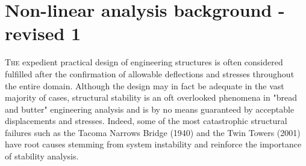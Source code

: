 



\chapter{Non-linear analysis background - revised 1}
\label{chap:chapter_2_2}

\renewcommand{\Thema}{Non-linear analysis background}

\lettrine[lines=2]{T}{he} expedient practical design of engineering structures is often considered fulfilled after the confirmation of allowable deflections and stresses throughout the entire domain. Although the design may in fact be adequate in the vast majority of cases, structural stability is an oft overlooked phenomena in "bread and butter" engineering analysis and is by no means guaranteed by acceptable displacements and stresses. Indeed, some of the most catastrophic structural failures such as the Tacoma Narrows Bridge (1940) and the Twin Towers (2001) have root  causes stemming from system instability and reinforce the importance of stability analysis.

